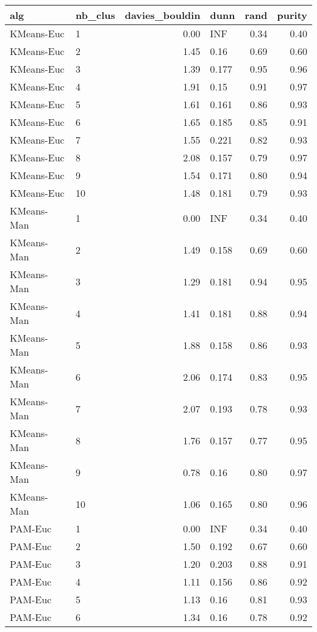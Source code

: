 \begin{table}[ht]
\centering
\begin{tabular}{llrlrr}
  \hline
alg & nb\_clus & davies\_bouldin & dunn & rand & purity \\ 
  \hline
KMeans-Euc & 1 & 0.00 & INF & 0.34 & 0.40 \\ 
  KMeans-Euc & 2 & 1.45 & 0.16 & 0.69 & 0.60 \\ 
  KMeans-Euc & 3 & 1.39 & 0.177 & 0.95 & 0.96 \\ 
  KMeans-Euc & 4 & 1.91 & 0.15 & 0.91 & 0.97 \\ 
  KMeans-Euc & 5 & 1.61 & 0.161 & 0.86 & 0.93 \\ 
  KMeans-Euc & 6 & 1.65 & 0.185 & 0.85 & 0.91 \\ 
  KMeans-Euc & 7 & 1.55 & 0.221 & 0.82 & 0.93 \\ 
  KMeans-Euc & 8 & 2.08 & 0.157 & 0.79 & 0.97 \\ 
  KMeans-Euc & 9 & 1.54 & 0.171 & 0.80 & 0.94 \\ 
  KMeans-Euc & 10 & 1.48 & 0.181 & 0.79 & 0.93 \\ 
  KMeans-Man & 1 & 0.00 & INF & 0.34 & 0.40 \\ 
  KMeans-Man & 2 & 1.49 & 0.158 & 0.69 & 0.60 \\ 
  KMeans-Man & 3 & 1.29 & 0.181 & 0.94 & 0.95 \\ 
  KMeans-Man & 4 & 1.41 & 0.181 & 0.88 & 0.94 \\ 
  KMeans-Man & 5 & 1.88 & 0.158 & 0.86 & 0.93 \\ 
  KMeans-Man & 6 & 2.06 & 0.174 & 0.83 & 0.95 \\ 
  KMeans-Man & 7 & 2.07 & 0.193 & 0.78 & 0.93 \\ 
  KMeans-Man & 8 & 1.76 & 0.157 & 0.77 & 0.95 \\ 
  KMeans-Man & 9 & 0.78 & 0.16 & 0.80 & 0.97 \\ 
  KMeans-Man & 10 & 1.06 & 0.165 & 0.80 & 0.96 \\ 
  PAM-Euc & 1 & 0.00 & INF & 0.34 & 0.40 \\ 
  PAM-Euc & 2 & 1.50 & 0.192 & 0.67 & 0.60 \\ 
  PAM-Euc & 3 & 1.20 & 0.203 & 0.88 & 0.91 \\ 
  PAM-Euc & 4 & 1.11 & 0.156 & 0.86 & 0.92 \\ 
  PAM-Euc & 5 & 1.13 & 0.16 & 0.81 & 0.93 \\ 
  PAM-Euc & 6 & 1.34 & 0.16 & 0.78 & 0.92 \\ 

\end{tabular}
\end{table}
